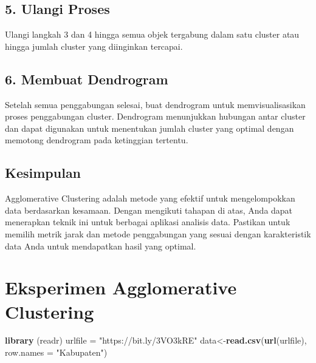 \documentclass[
  oneside]{book}
\newenvironment{Shaded}{\begin{snugshade}}{\end{snugshade}}
\newcommand{\AttributeTok}[1]{\textcolor[rgb]{0.13,0.29,0.53}{#1}}
\newcommand{\FunctionTok}[1]{\textcolor[rgb]{0.13,0.29,0.53}{\textbf{#1}}}
\newcommand{\NormalTok}[1]{#1}
\newcommand{\OtherTok}[1]{\textcolor[rgb]{0.56,0.35,0.01}{#1}}
\newcommand{\StringTok}[1]{\textcolor[rgb]{0.31,0.60,0.02}{#1}}
\begin{document}
\subsection*{5. Ulangi Proses}\label{ulangi-proses}

Ulangi langkah 3 dan 4 hingga semua objek tergabung dalam satu cluster atau hingga jumlah cluster yang diinginkan tercapai.

\subsection*{6. Membuat Dendrogram}\label{membuat-dendrogram}

Setelah semua penggabungan selesai, buat dendrogram untuk memvisualisasikan proses penggabungan cluster. Dendrogram menunjukkan hubungan antar cluster dan dapat digunakan untuk menentukan jumlah cluster yang optimal dengan memotong dendrogram pada ketinggian tertentu.

\subsection*{Kesimpulan}\label{kesimpulan}

Agglomerative Clustering adalah metode yang efektif untuk mengelompokkan data berdasarkan kesamaan. Dengan mengikuti tahapan di atas, Anda dapat menerapkan teknik ini untuk berbagai aplikasi analisis data. Pastikan untuk memilih metrik jarak dan metode penggabungan yang sesuai dengan karakteristik data Anda untuk mendapatkan hasil yang optimal.

\section{Eksperimen Agglomerative Clustering}\label{eksperimen-agglomerative-clustering}

\begin{Shaded}
\begin{Highlighting}[]
\FunctionTok{library}\NormalTok{ (readr)}
\NormalTok{urlfile }\OtherTok{=} \StringTok{"https://bit.ly/3VO3kRE"}
\NormalTok{data}\OtherTok{\textless{}{-}}\FunctionTok{read.csv}\NormalTok{(}\FunctionTok{url}\NormalTok{(urlfile), }\AttributeTok{row.names =} \StringTok{"Kabupaten"}\NormalTok{)}
\end{Highlighting}
\end{Shaded}
\end{document}
